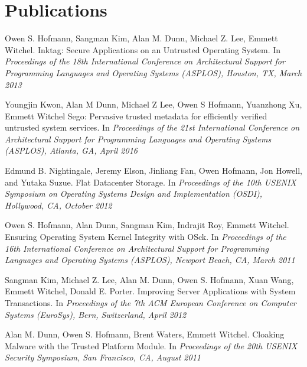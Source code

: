 \section{Publications}
\begin{bibsectionfirst}

\item Owen S. Hofmann, Sangman Kim, Alan M. Dunn, Michael Z. Lee, Emmett
Witchel.
Inktag: Secure Applications on an Untrusted Operating System.
In \emph {Proceedings of the 18th International Conference on
Architectural Support for Programming Languages and Operating Systems
(ASPLOS), Houston, TX, March 2013}

\end{bibsectionfirst}
\begin{bibsection}
\item Youngjin Kwon, Alan M Dunn, Michael Z Lee, Owen S Hofmann, Yuanzhong Xu, Emmett Witchel
Sego: Pervasive trusted metadata for efficiently verified untrusted system services.
In \emph{Proceedings of the 21st International Conference on Architectural Support for Programming Languages and Operating Systems (ASPLOS), Atlanta, GA, April 2016}

\item Edmund B. Nightingale, Jeremy Elson, Jinliang Fan, Owen Hofmann, Jon
Howell, and Yutaka Suzue.
Flat Datacenter Storage. 
In \emph{Proceedings of the 10th USENIX Symposium on Operating Systems
Design and Implementation (OSDI), Hollywood, CA, October 2012}

\item Owen S. Hofmann, Alan Dunn, Sangman Kim, Indrajit Roy, Emmett Witchel.
Ensuring Operating System Kernel Integrity with OSck.
In \emph{Proceedings of the 16th International Conference on Architectural
Support for Programming Languages and Operating Systems (ASPLOS), Newport
Beach, CA, March 2011} 

\item Sangman Kim, Michael Z. Lee, Alan M. Dunn, Owen S. Hofmann, Xuan
Wang, Emmett Witchel, Donald E. Porter.
Improving Server Applications with System Transactions.
In \emph{Proceedings of the 7th ACM European Conference on Computer Systems
(EuroSys), Bern, Switzerland, April 2012}

\item Alan M. Dunn, Owen S. Hofmann, Brent Waters, Emmett Witchel.
Cloaking Malware with the Trusted Platform Module.
In \emph{Proceedings of the 20th USENIX Security Symposium, San Francisco,
CA, August 2011}


\end{bibsection}
